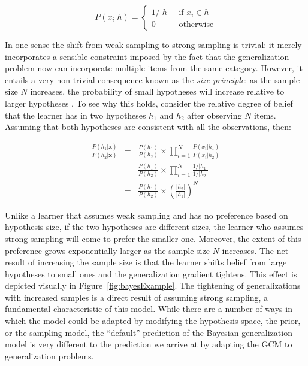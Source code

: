 \documentclass[doc,apacite]{apa6}
\begin{document}
\begin{equation}
\label{strongSampling}
P(x_i | h) = \left\{ \begin{array}{lr} 1/|h| & \mbox{ if } x_i \in h \\ 0 & \mbox{ otherwise} \end{array} \right.
\end{equation}

In one sense the shift from weak sampling to strong sampling is trivial: it merely incorporates a sensible constraint imposed by the fact that the generalization problem now can incorporate multiple items from the same category. However, it entails a very non-trivial consequence known as the {\it size principle}: as the sample size $N$ increases, the probability of small hypotheses will increase relative to larger hypotheses
\cite{tenenbaum1999bayesian}. To see why this holds, consider the relative degree of belief that the learner has in two hypotheses $h_1$ and $h_2$ after observing $N$ items. Assuming that both hypotheses are consistent with all the observations, then:

\begin{eqnarray}
\label{tg4}
\frac{P(h_1 | \bm{x})}{P(h_2 | \bm{x})} 
&=& \frac{P(h_1)}{P(h_2)} \times \prod_{i=1}^{N} \frac{P(x_i | h_1)}{P(x_i | h_2)} \nonumber \\
&=& \frac{P(h_1)}{P(h_2)} \times \prod_{i=1}^{N} \frac{1/|h_1|}{1/|h_2|} \nonumber \\
&=& \frac{P(h_1)}{P(h_2)} \times  \left( \frac{|h_2|}{|h_1|} \right)^N
\end{eqnarray}

\noindent
Unlike a learner that assumes weak sampling and has no preference based on hypothesis size, if the two hypotheses are different sizes, the learner who assumes strong sampling will come to prefer the smaller one. Moreover, the extent of this preference grows exponentially larger as the sample size $N$ increases. The net result of increasing the sample size is that the learner shifts belief from large hypotheses to small ones and the generalization gradient tightens. This effect is depicted visually in Figure~\ref{fig:bayesExample}. The tightening of generalizations with increased samples is a direct result of assuming strong sampling, a fundamental characteristic of this model.
While there are a number of ways in which the model could be adapted by modifying the hypothesis space, the prior, or the sampling model, the ``default'' prediction of the Bayesian generalization model is very different to the prediction we arrive at by adapting the GCM to generalization problems.
\end{document}
